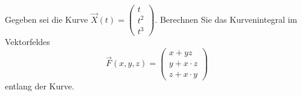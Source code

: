 Gegeben sei die Kurve 
$\vec{X}(t) = \begin{pmatrix} t \\ t^2 \\ t^3 \end{pmatrix}$.
Berechnen Sie das Kurvenintegral im Vektorfeldes
\[
\vec{F}(x,y,z) 
= \begin{pmatrix} x + yz \\ y + x \cdot z \\ z + x \cdot y \end{pmatrix}
\]
entlang der Kurve.
